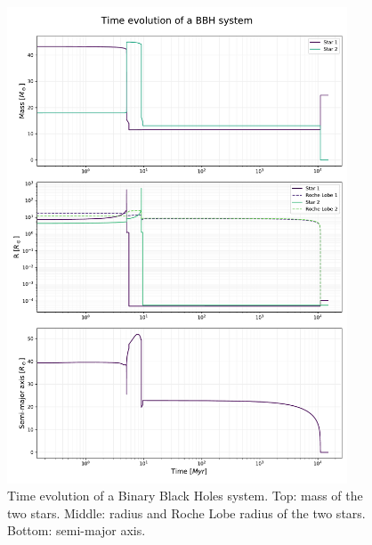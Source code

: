 \documentclass[prb,twocolumn,9pt]{revtex4-1}
\begin{document}
\begin{figure}[!t]
    \begin{minipage}[l]{1.0\columnwidth}
    \centering
    \includegraphics[width=0.9\textwidth]{images/method/time_evolution.pdf}
    \caption{Time evolution of a Binary Black Holes system. Top: mass of the two stars. Middle: radius and Roche Lobe radius of the two stars. Bottom: semi-major axis. }
    \label{fig:time_evolution}
    \end{minipage}
\end{figure}
\end{document}
